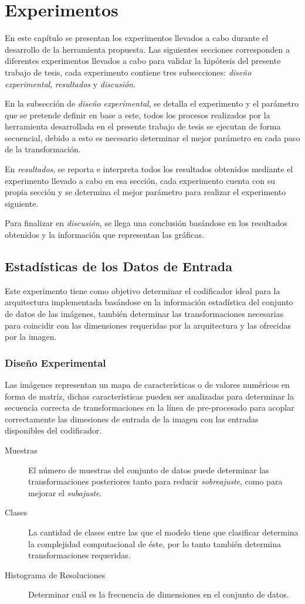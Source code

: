 \chapter{Experimentos}
En este capítulo se presentan los experimentos llevados a cabo durante el desarrollo de la herramienta propuesta. Las siguientes secciones corresponden a diferentes experimentos llevados a cabo para validar la hipótesis del presente trabajo de tesis, cada experimento contiene tres subsecciones: \emph{diseño experimental}, \emph{resultados} y \emph{discusión}.

En la subsección de \emph{diseño experimental}, se detalla el experimento y el parámetro que se pretende definir en base a este, todos los procesos realizados por la herramienta desarrollada en el presente trabajo de tesis se ejecutan de forma secuencial, debido a esto es necesario determinar el mejor parámetro en cada paso de la transformación.

En \emph{resultados}, se reporta e interpreta todos los resultados obtenidos mediante el experimento llevado a cabo en esa sección, cada experimento cuenta con su propia sección y se determina el mejor parámetro para realizar el experimento siguiente. 

Para finalizar en \emph{discusión}, se llega una conclusión basándose en los resultados obtenidos y la información que representan las gráficas.


\section{Estadísticas de los Datos de Entrada} 
Este experimento tiene como objetivo determinar el codificador ideal para la arquitectura implementada basándose en la información estadística del conjunto de datos de las imágenes, también determinar las transformaciones necesarias para coincidir con las dimensiones requeridas por la arquitectura y las ofrecidas por la imagen.

\subsection{Diseño Experimental}
Las imágenes representan un mapa de características o de valores numéricos en forma de matríz, dichas características pueden ser analizadas para determinar la secuencia correcta de transformaciones en la línea de pre-procesado para acoplar correctamente las dimesiones de entrada de la imagen con las entradas disponibles del codificador.
\begin{description}
    \item[Muestras] El número de muestras del conjunto de datos puede determinar las transformaciones posteriores tanto para reducir \emph{sobreajuste}, como para mejorar el \emph{subajuste}.
    \item[Clases] La cantidad de clases entre las que el modelo tiene que clasificar determina la complejidad computacional de éste, por lo tanto también determina transformaciones requeridas.
    \item[Histograma de Resoluciones] Determinar cuál es la frecuencia de dimensiones en el conjunto de datos.  
\end{description}
